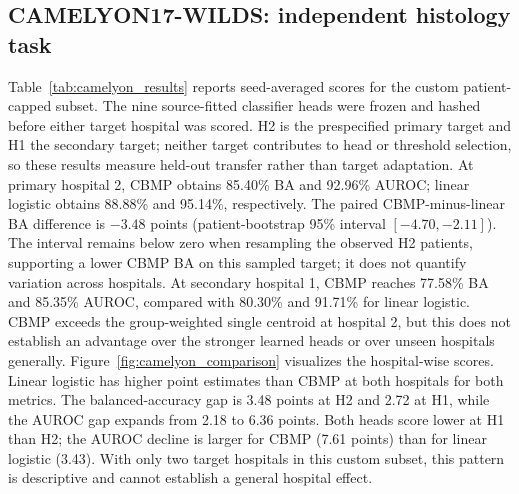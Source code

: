 \subsection{CAMELYON17-WILDS: independent histology task}
Table~\ref{tab:camelyon_results} reports seed-averaged scores for the custom patient-capped subset. The nine source-fitted classifier heads were frozen and hashed before either target hospital was scored. H2 is the prespecified primary target and H1 the secondary target; neither target contributes to head or threshold selection, so these results measure held-out transfer rather than target adaptation. At primary hospital 2, CBMP obtains 85.40\% BA and 92.96\% AUROC; linear logistic obtains 88.88\% and 95.14\%, respectively. The paired CBMP-minus-linear BA difference is $-3.48$ points (patient-bootstrap 95\% interval $[-4.70,-2.11]$). The interval remains below zero when resampling the observed H2 patients, supporting a lower CBMP BA on this sampled target; it does not quantify variation across hospitals. At secondary hospital 1, CBMP reaches 77.58\% BA and 85.35\% AUROC, compared with 80.30\% and 91.71\% for linear logistic. CBMP exceeds the group-weighted single centroid at hospital 2, but this does not establish an advantage over the stronger learned heads or over unseen hospitals generally. Figure~\ref{fig:camelyon_comparison} visualizes the hospital-wise scores. Linear logistic has higher point estimates than CBMP at both hospitals for both metrics. The balanced-accuracy gap is 3.48 points at H2 and 2.72 at H1, while the AUROC gap expands from 2.18 to 6.36 points. Both heads score lower at H1 than H2; the AUROC decline is larger for CBMP (7.61 points) than for linear logistic (3.43). With only two target hospitals in this custom subset, this pattern is descriptive and cannot establish a general hospital effect.

